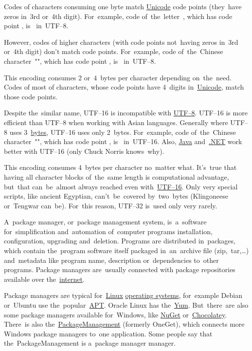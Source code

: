 Codes of characters consuming one byte match \hyperref[unicode]{Unicode} code points (they~have zeros in~3rd or~4th digit).
For~example, code of~the~letter~, which has code point , is~ \mbox{in UTF--8}.

However, codes of higher characters (with code points not~having zeros in~3rd or~4th digit) don't match code points.
For~example, code of~the~Chinese \mbox{character ""}, which has code point , \mbox{is~} \mbox{in UTF--8}.

\label{utf16}
This encoding consumes 2 or~4~bytes per character depending on~the~need.
Codes of most of characters, whose code points have 4~digits in~\hyperref[unicode]{Unicode}, match those code points.

Despite the~similar name, \mbox{UTF--16} is incompatible with \hyperref[utf8]{\mbox{UTF--8}}.
\mbox{UTF--16} is more efficient than \mbox{UTF--8} when working with Asian languages.
Generally where \mbox{UTF--8} uses 3~\hyperref[bitsandbytes]{bytes}, \mbox{UTF--16} uses only 2~bytes.
For~example, code of~the~Chinese \mbox{character ""}, which has code point , \mbox{is~} \mbox{in UTF--16}.
Also, \hyperref[java]{Java} and~\hyperref[dotnet]{.NET} work better with \mbox{UTF--16} (only Chuck Norris knows~why).

This encoding consumes 4~bytes per character no~matter what.
It's~true that having all character blocks of~the~same length is computational advantage, but~that can~be~almost always reached even \mbox{with~\hyperref[utf16]{UTF--16}}.
Only very special scripts, like ancient Egyptian, can't~be~covered by~two~bytes (Klingoneese or~Tengwar can~be).
For~this reason, \mbox{UTF--32} is~used only very rarely.

\label{packagemanager}
A~package manager, or~package management system, is~a~software for~simplification and~automation of~computer programs installation, configuration, upgrading and~deletion.
Programs are distributed in~packages, which contain the~program software itself packaged in~an~archive file (zip,~tar,\dots) and~metadata like program name, description or~dependencies to~other programs.
Package managers are~usually connected with package repositories available over the~\hyperref[internetweb]{internet}.

Package managers are typical for~\hyperref[linux]{Linux} \hyperref[os]{operating systems}, for~example Debian or~Ubuntu use the~popular~\hyperref[linuxapt]{APT}.
Oracle Linux has the~\href{http://yum.baseurl.org/}{Yum}.
But~there~are also some package managers available for~Windows, like \href{https://www.nuget.org/}{NuGet} or~\href{https://chocolatey.org/}{Chocolatey}.
There~is also the~\hyperref[windowspackagemanagement]{PackageManagement} (formerly OneGet), which connects more Windows package managers to~one application.
Some people say that the~PackageManagement is a~package manager manager.

